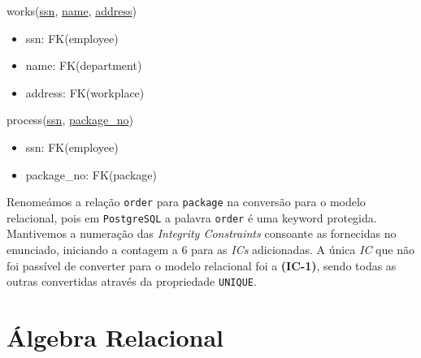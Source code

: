 \documentclass[12pt,a4paper]{article}
\begin{document}
  \vspace*{10pt}
  \noindent
  works(\underline{ssn}, \underline{name}, \underline{address})
  \begin{itemize}[nosep]
      \item ssn: FK(employee)
      \item name: FK(department)
      \item address: FK(workplace)
  \end{itemize}

  \vspace*{10pt}
  \noindent
  process(\underline{ssn}, \underline{package\_no})
  \begin{itemize}[nosep]
      \item ssn: FK(employee)
      \item package\_no: FK(package)
  \end{itemize}
  \sffamily

  \vspace*{10pt}
  \noindent
  Renomeámos a relação \texttt{order} para \texttt{package} na conversão para o modelo relacional, pois em \texttt{PostgreSQL} a palavra \texttt{order} é uma keyword protegida.
  Mantivemos a numeração das \textit{Integrity Constraints} consoante as fornecidas no enunciado, iniciando a contagem a 6 para as \textit{ICs} adicionadas.
  A única \textit{IC} que não foi passível de converter para o modelo relacional foi a \textbf{(IC-1)}, sendo todas as outras convertidas através da propriedade \texttt{UNIQUE}.

  \section*{Álgebra Relacional}
\end{document}

